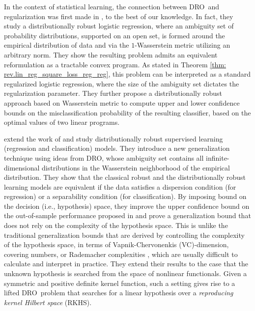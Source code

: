 \documentclass[final,onefignum,onetabnum]{class}
\newcommand{\dro}{DRO}
\begin{document}
In the context of statistical learning, the connection between \dro\ and regularization was first made in \citet{shafieezadeh2015}, to the best of our knowledge. In fact, they study a distributionally robust logistic regression, where an ambiguity set of %
probability distributions, supported on an open set, is formed around the empirical distribution of data and via the $1$-Wasserstein metric utilizing an arbitrary norm. They show the resulting problem admits an equivalent reformulation as a tractable convex program. As stated in Theorem \ref{thm: rev.lin_reg_square_loss_reg_reg}, this problem can be interpreted as a standard regularized  logistic regression, where the size of the ambiguity set dictates the regularization parameter.
They further propose a distributionally robust approach
based on Wasserstein metric to compute upper and lower confidence bounds on the
misclassification probability of the resulting classifier, based on  the optimal values of two  linear programs. 





\citet{shafieezadeh2017} extend the work of \citet{shafieezadeh2015} and study distributionally robust supervised learning (regression and classification) models. They introduce a new generalization technique using ideas from \dro, whose ambiguity set contains all infinite-dimensional distributions in the Wasserstein neighborhood of the empirical  distribution.  They show that the classical robust and the distributionally robust learning models are equivalent if the data satisfies a dispersion condition (for regression) or a separability condition (for classification). By imposing bound on the decision (i.e., hypothesis)  space, they  improve the upper confidence bound on the out-of-sample performance proposed in \citet{mohajerin2018} and prove a generalization bound that does not rely on the complexity of the hypothesis space. This is unlike the traditional generalization
bounds that are derived by controlling the complexity of the hypothesis space, in terms of Vapnik-Chervonenkis (VC)-dimension, covering numbers,  or Rademacher complexities \cite{bartlett2002,shalev2014ML}, which are usually difficult to calculate and interpret in practice. 
They extend their results to the case that the unknown hypothesis is searched from the space of nonlinear functionals. Given a symmetric and positive definite kernel function, such a setting gives rise to  a lifted \dro\ problem that searches for a linear hypothesis  over  a {\it reproducing kernel Hilbert space} (RKHS).  
\end{document}
